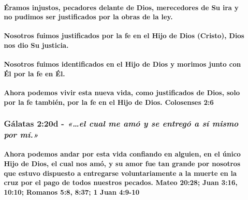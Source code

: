 \documentclass[11a pt,twoside]{article}
\newcommand{\scripture}[1]{%
  {\fontsize{12pt}{16pt}\selectfont\ScriptureFont\itshape #1}%
}
\let\oldsubsubsection\subsubsection
\renewcommand{\subsubsection}{\needspace{4\baselineskip}\oldsubsubsection}
\let\oldparagraph\paragraph
\renewcommand{\paragraph}{\needspace{3\baselineskip}\oldparagraph}
\begin{document}
\paragraph{Éramos injustos, pecadores delante de Dios, merecedores de Su
ira y no pudimos ser justificados por la obras de la
ley.}\label{uxe9ramos-injustos-pecadores-delante-de-dios-merecedores-de-su-ira-y-no-pudimos-ser-justificados-por-la-obras-de-la-ley.}

\paragraph{Nosotros fuimos justificados por la fe en el Hijo de Dios
(Cristo), Dios nos dio Su
justicia.}\label{nosotros-fuimos-justificados-por-la-fe-en-el-hijo-de-dios-cristo-dios-nos-dio-su-justicia.}

\paragraph{Nosotros fuimos identificados en el Hijo de Dios y morimos
junto con Él por la fe en
Él.}\label{nosotros-fuimos-identificados-en-el-hijo-de-dios-y-morimos-junto-con-uxe9l-por-la-fe-en-uxe9l.}

\paragraph{Ahora podemos vivir esta nueva vida, como justificados de
Dios, solo por la fe también, por la fe en el Hijo de Dios. Colosenses
2:6}\label{ahora-podemos-vivir-esta-nueva-vida-como-justificados-de-dios-solo-por-la-fe-tambiuxe9n-por-la-fe-en-el-hijo-de-dios.-colosenses-26}

\subsubsection{\texorpdfstring{Gálatas 2:20d -
\scripture{«…el cual me amó y se entregó a sí mismo por mí.»}}{Gálatas 2:20d - }}\label{guxe1latas-220d---el-cual-me-amuxf3-y-se-entreguxf3-a-suxed-mismo-por-muxed.}

\paragraph{Ahora podemos andar por esta vida confiando en alguien, en el
único Hijo de Dios, el cual nos amó, y su amor fue tan grande por
nosotros que estuvo dispuesto a entregarse voluntariamente a la muerte
en la cruz por el pago de todos nuestros pecados. Mateo 20:28; Juan
3:16, 10:10; Romanos 5:8, 8:37; 1 Juan
4:9-10}\label{ahora-podemos-andar-por-esta-vida-confiando-en-alguien-en-el-uxfanico-hijo-de-dios-el-cual-nos-amuxf3-y-su-amor-fue-tan-grande-por-nosotros-que-estuvo-dispuesto-a-entregarse-voluntariamente-a-la-muerte-en-la-cruz-por-el-pago-de-todos-nuestros-pecados.-mateo-2028-juan-316-1010-romanos-58-837-1-juan-49-10}
\end{document}
